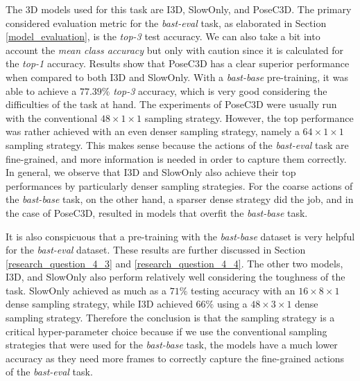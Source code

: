\documentclass[extern,palatino]{cgMA}
\begin{document}
The 3D models used for this task are I3D, SlowOnly, and PoseC3D. The primary considered evaluation metric for the \textit{bast-eval} task, as elaborated in Section \ref{model_evaluation}, is the \textit{top-3} test accuracy. We can also take a bit into account the \textit{mean class accuracy} but only with caution since it is calculated for the \textit{top-1} accuracy. Results show that PoseC3D has a clear superior performance when compared to both I3D and SlowOnly. With a \textit{bast-base} pre-training, it was able to achieve a $77.39\%$ \textit{top-3} accuracy, which is very good considering the difficulties of the task at hand. The experiments of PoseC3D were usually run with the conventional $48 \times 1 \times 1$ sampling strategy. However, the top performance was rather achieved with an even denser sampling strategy, namely a $64 \times 1 \times 1$ sampling strategy. This makes sense because the actions of the \textit{bast-eval} task are fine-grained, and more information is needed in order to capture them correctly. In general, we observe that I3D and SlowOnly also achieve their top performances by particularly denser sampling strategies. For the coarse actions of the \textit{bast-base} task, on the other hand, a sparser dense strategy did the job, and in the case of PoseC3D, resulted in models that overfit the \textit{bast-base} task.

It is also conspicuous that a pre-training with the \textit{bast-base} dataset is very helpful for the \textit{bast-eval} dataset. These results are further discussed in Section \ref{research_question_4_3} and \ref{research_question_4_4}. The other two models, I3D, and SlowOnly also perform relatively well considering the toughness of the task. SlowOnly achieved as much as a $71\%$ testing accuracy with an $16 \times 8 \times 1$ dense sampling strategy, while I3D achieved $66\%$ using a $48 \times 3 \times 1$ dense sampling strategy. Therefore the conclusion is that the sampling strategy is a critical hyper-parameter choice because if we use the conventional sampling strategies that were used for the \textit{bast-base} task, the models have a much lower accuracy as they need more frames to correctly capture the fine-grained actions of the \textit{bast-eval} task.
\end{document}
